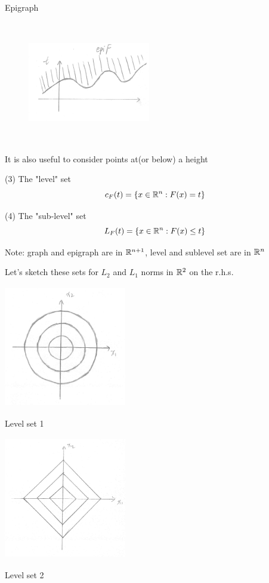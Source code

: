Epigraph
\begin{figure}
	\centering
	\includegraphics[width=2.1in,height=2.1in]{figures/ch02/p47-2.jpg}
\end{figure}



It is also useful to consider points at(or below) a height

(3) The "level" set
$$c_{F}(t)=\{x\in\mathbb{R}^{n}:F(x)=t\}$$

(4) The "sub-level" set
$$L_{F}(t)=\{x\in\mathbb{R}^{n}:F(x)\leq t\}$$

Note: graph and epigraph are in $\mathbb{R}^{n+1}$, level and sublevel set are in $\mathbb{R}^{n}$


\vspace{0.5cm}
Let's sketch these sets for $L_{2}$ and $L_{1}$ norms in $\mathbb{R}^{2}$ on the r.h.s.

\newpage

\begin{marginfigure}
	\centering
	\includegraphics[width=2.1in,height=2.1in]{figures/ch02/p48-5.jpg}
		\caption{Level set 1} 
\end{marginfigure}

\begin{marginfigure}
	\centering
	\includegraphics[width=2.1in,height=2.1in]{figures/ch02/p48-6.jpg}
	\caption{Level set 2} 
\end{marginfigure}

